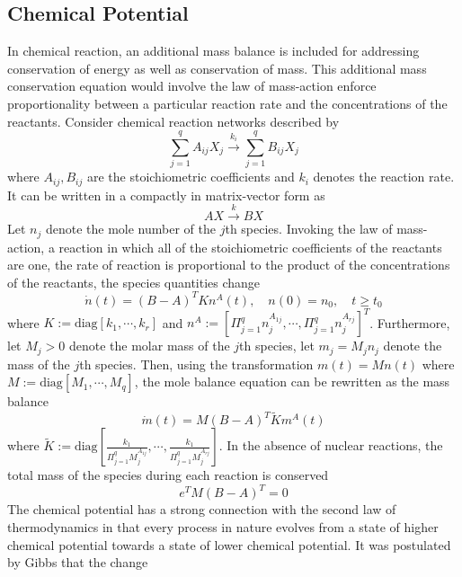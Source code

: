 \documentclass{paper}
\begin{document}
\subsection{Chemical Potential}
In chemical reaction, an additional mass balance is included for addressing conservation of energy as well as conservation of mass.
This additional mass conservation equation would involve the law of mass-action enforce proportionality between a particular reaction
rate and the concentrations of the reactants. Consider chemical reaction networks described by
\begin{equation}
\sum\limits_{j=1}^{q}A_{ij}X_j\overset{k_i}{\longrightarrow} \sum\limits_{j=1}^{q}B_{ij}X_j
\end{equation}
where $A_{ij},B_{ij}$ are the stoichiometric coefficients and $k_i$ denotes the reaction rate. It can be written in a compactly in 
matrix-vector form as 
\begin{equation}\label{eq:chem}
AX\overset{k}{\longrightarrow} BX
\end{equation}
Let $n_j$ denote the mole number of the $j$th species. Invoking the law of mass-action, a reaction in which all of the stoichiometric 
coefficients of the reactants are one, the rate of reaction is proportional to the product of the concentrations of the reactants, the 
species quantities change 
\begin{equation}
\dot{n}(t)=(B-A)^TKn^A(t),\quad n(0)=n_0,\quad t\geqslant t_0
\end{equation}
where $K:=\text{diag}[k_1,\cdots,k_r]$ and $n^A:=\left[\Pi_{j=1}^qn_j^{A_{1j}},\cdots,\Pi_{j=1}^qn_j^{A_{rj}}\right]^T$. Furthermore,
let $M_j>0$ denote the molar mass of the $j$th species, let $m_j=M_jn_j$ denote the mass of the $j$th species. Then, using the transformation
$m(t)=Mn(t)$ where $M:=\text{diag}[M_1,\cdots,M_q]$, the mole balance equation can be rewritten as the mass balance
\begin{equation}
\dot{m}(t)=M(B-A)^T\tilde{K}m^A(t)
\end{equation}
where $\tilde{K}:=\text{diag}\left[\frac{k_1}{\Pi_{j=1}^qM_j^{A_{1j}}},\cdots,\frac{k_1}{\Pi_{j=1}^qM_j^{A_{rj}}}\right]$. In the absence
of nuclear reactions, the total mass of the species during each reaction is conserved
\begin{equation}
e^TM(B-A)^T=0
\end{equation}
The chemical potential has a strong connection with the second law of thermodynamics in that every process in nature evolves from 
a state of higher chemical potential towards a state of lower chemical potential. It was postulated by Gibbs that the change
\end{document}
